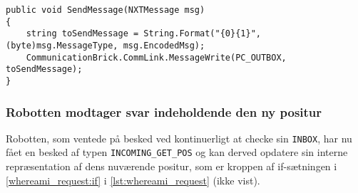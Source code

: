 \begin{lstlisting}[style=csharpsmall,label=lst:sendmessage,caption=SendMessage i NXTPostman.]
public void SendMessage(NXTMessage msg)
{
    string toSendMessage = String.Format("{0}{1}", (byte)msg.MessageType, msg.EncodedMsg);
    CommunicationBrick.CommLink.MessageWrite(PC_OUTBOX, toSendMessage);
}
\end{lstlisting}

\subsubsection{Robotten modtager svar indeholdende den ny positur}
Robotten, som ventede på besked ved kontinuerligt at checke sin \lstinline[style=c]!INBOX!, har nu fået en besked af typen \lstinline[style=c]!INCOMING_GET_POS! og kan derved opdatere sin interne repræsentation af dens nuværende positur, som er kroppen af if-sætningen i \cref{whereami_request:if} i \cref{lst:whereami_request} (ikke vist).
